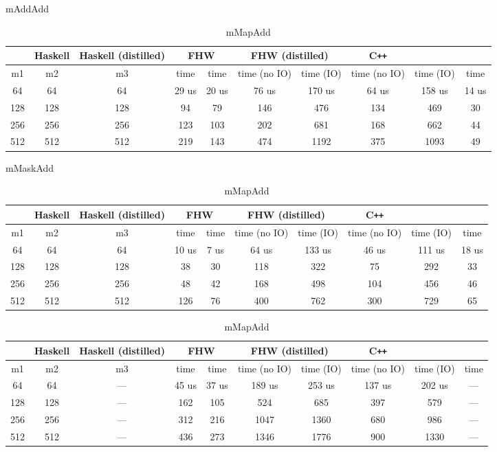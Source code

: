 \begin{table}[t]
\scriptsize
\centering
\caption*{mAddAdd}
\begin{tabular}{|c|c|c|c|c|c|c|c|c|c|} 
\hline
\rowcolor{LightBlue}
\multicolumn{3}{|c|}{Matrices dimensions} & Haskell & Haskell (distilled) & \multicolumn{2}{c|}{FHW} & \multicolumn{2}{c|}{FHW (distilled)} & {C\texttt{++}}\\
\hline
m1 & m2 & m3 & time & time & time (no IO) & time (IO) & time (no IO) & time (IO) & time \\ 
\hline
64 & 64 & 64 & 29 us & 20 us & 76 us & 170 us & 64 us & 158 us & 14 us\\ 
128 & 128 & 128 & 94 & 79 & 146 & 476 & 134 & 469 & 30 \\
256 & 256 & 256 & 123 & 103 & 202 &  681 & 168 & 662 & 44\\
512 & 512 & 512 & 219 & 143 & 474 & 1192 & 375 & 1093 & 49\\
\hline
\end{tabular}

\caption*{mMaskAdd}
\begin{tabular}{|c|c|c|c|c|c|c|c|c|c|} 
\hline
\rowcolor{LightBlue}
\multicolumn{3}{|c|}{Matrices dimensions} & Haskell & Haskell (distilled) & \multicolumn{2}{c|}{FHW} & \multicolumn{2}{c|}{FHW (distilled)} & {C\texttt{++}}\\
\hline
m1 & m2 & m3 & time & time & time (no IO) & time (IO) & time (no IO) & time (IO) & time \\ 
\hline
64 & 64 & 64 & 10 us & 7 us & 64 us & 133 us & 46 us & 111 us & 18 us\\ 
128 & 128 & 128 & 38 & 30 & 118 & 322 & 75 & 292 & 33 \\
256 & 256 & 256 & 48 & 42 & 168 &  498 & 104 & 456 & 46\\
512 & 512 & 512 & 126 & 76 & 400 & 762 & 300 & 729 & 65\\
\hline
\end{tabular}

\caption*{mMapAdd}
\begin{tabular}{|c|c|c|c|c|c|c|c|c|c|} 
\hline
\rowcolor{LightBlue}
\multicolumn{3}{|c|}{Matrices dimensions} & Haskell & Haskell (distilled) & \multicolumn{2}{c|}{FHW} & \multicolumn{2}{c|}{FHW (distilled)} & {C\texttt{++}}\\
\hline
m1 & m2 & m3 & time & time & time (no IO) & time (IO) & time (no IO) & time (IO) & time \\ 
\hline
64 & 64 & --- & 45 us & 37 us & 189 us & 253 us & 137 us & 202 us & ---\\ 
128 & 128 & --- & 162 & 105 & 524 & 685 & 397 & 579 & --- \\
256 & 256 & --- & 312 & 216 & 1047 &  1360 & 680 & 986 & ---\\
512 & 512 & --- & 436 & 273 & 1346 & 1776 & 900 & 1330 & ---\\
\hline
\end{tabular}


\end{table}
